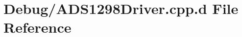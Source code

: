\hypertarget{_debug_2_a_d_s1298_driver_8cpp_8d}{\section{\-Debug/\-A\-D\-S1298\-Driver.cpp.\-d \-File \-Reference}
\label{_debug_2_a_d_s1298_driver_8cpp_8d}
}
